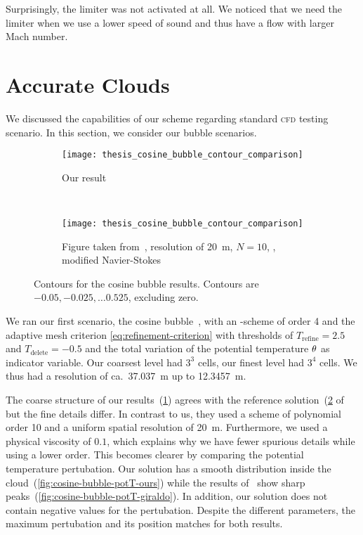 Surprisingly, the limiter was not activated at all.
We noticed that we need the limiter when we use a lower speed of sound and thus have a flow with larger Mach number.

\section{Accurate Clouds}\label{sec:results-cloud}
We discussed the capabilities of our scheme regarding standard \textsc{cfd} testing scenario.
In this section, we consider our bubble scenarios.
\begin{figure}[htb]
  \centering
  \begin{subfigure}[t]{0.5\textwidth}
    \centering
    \texttt{[image: thesis\_cosine\_bubble\_contour\_comparison]}
    \caption{\label{fig:cosine-bubble-contour-ours}%
      Our result}
  \end{subfigure}~%
  \begin{subfigure}[t]{0.5\textwidth}
    \centering
    \texttt{[image: thesis\_cosine\_bubble\_contour\_comparison]}
    \caption{\label{fig:cosine-bubble-contour-giraldo}%
      Figure taken from~\cite{giraldo2008study}, resolution of \SI{20}{\m}, $N = 10$, \dg{}, modified Navier-Stokes} %
  \end{subfigure}
  \caption{\label{fig:cosine-bubble-contour}%
    Contours for the cosine bubble results.
    Contours are $-0.05, -0.025, \ldots 0.525$, excluding zero.
  }
\end{figure}
We ran our first scenario, the cosine bubble~, with an \aderdg{}-scheme of order 4 and the adaptive mesh criterion \cref{eq:refinement-criterion} with thresholds of $T_\text{refine} = 2.5$ and $T_\text{delete} = -0.5$ and the total variation of the potential temperature $\theta$ as indicator variable.
Our coarsest level had $3^3$ cells, our finest level had $3^4$ cells.
We thus had a resolution of ca.\ \SI{37.037}{\m} up to \SI{12.3457}{\m}.

The coarse structure of our results~(\cref{fig:cosine-bubble-contour-ours}) agrees with the reference solution~(\cref{fig:cosine-bubble-contour-giraldo} of~\cite{giraldo2008study} but the fine details differ.
In contrast to us, they used a scheme of polynomial order 10 and a uniform spatial resolution of \SI{20}{\m}.
Furthermore, we used a physical viscosity of $0.1$, which explains why we have fewer spurious details while using a lower order.
This becomes clearer by comparing the potential temperature pertubation.
Our solution has a smooth distribution inside the cloud~(\cref{fig:cosine-bubble-potT-ours}) while the results of~\cite{giraldo2008study} show sharp peaks~(\cref{fig:cosine-bubble-potT-giraldo}).
In addition, our solution does not contain negative values for the pertubation.
Despite the different parameters, the maximum pertubation and its position matches for both results.

